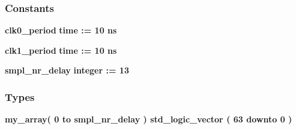 \subsubsection*{Constants}
 \begin{DoxyCompactItemize}
\item 
{\bf clk0\+\_\+period} {\bfseries \textcolor{comment}{time}\textcolor{vhdlchar}{ }\textcolor{vhdlchar}{ }\textcolor{vhdlchar}{\+:}\textcolor{vhdlchar}{=}\textcolor{vhdlchar}{ }\textcolor{vhdlchar}{ }\textcolor{vhdlchar}{ } \textcolor{vhdldigit}{10} \textcolor{vhdlchar}{ }\textcolor{vhdlchar}{ns}\textcolor{vhdlchar}{ }} 
\item 
{\bf clk1\+\_\+period} {\bfseries \textcolor{comment}{time}\textcolor{vhdlchar}{ }\textcolor{vhdlchar}{ }\textcolor{vhdlchar}{\+:}\textcolor{vhdlchar}{=}\textcolor{vhdlchar}{ }\textcolor{vhdlchar}{ }\textcolor{vhdlchar}{ } \textcolor{vhdldigit}{10} \textcolor{vhdlchar}{ }\textcolor{vhdlchar}{ns}\textcolor{vhdlchar}{ }} 
\item 
{\bf smpl\+\_\+nr\+\_\+delay} {\bfseries \textcolor{comment}{integer}\textcolor{vhdlchar}{ }\textcolor{vhdlchar}{ }\textcolor{vhdlchar}{\+:}\textcolor{vhdlchar}{=}\textcolor{vhdlchar}{ }\textcolor{vhdlchar}{ } \textcolor{vhdldigit}{13} \textcolor{vhdlchar}{ }} 
\end{DoxyCompactItemize}
\subsubsection*{Types}
 \begin{DoxyCompactItemize}
\item 
{\bfseries {\bf my\+\_\+array}{\bfseries \textcolor{vhdlchar}{(}\textcolor{vhdlchar}{ }\textcolor{vhdlchar}{ } \textcolor{vhdldigit}{0} \textcolor{vhdlchar}{ }\textcolor{keywordflow}{to}\textcolor{vhdlchar}{ }\textcolor{vhdlchar}{ }\textcolor{vhdlchar}{ }\textcolor{vhdlchar}{ }{\bfseries {\bf smpl\+\_\+nr\+\_\+delay}} \textcolor{vhdlchar}{ }\textcolor{vhdlchar}{)}\textcolor{vhdlchar}{ }\textcolor{vhdlchar}{ }\textcolor{comment}{std\+\_\+logic\+\_\+vector}\textcolor{vhdlchar}{ }\textcolor{vhdlchar}{(}\textcolor{vhdlchar}{ }\textcolor{vhdlchar}{ } \textcolor{vhdldigit}{63} \textcolor{vhdlchar}{ }\textcolor{keywordflow}{downto}\textcolor{vhdlchar}{ }\textcolor{vhdlchar}{ } \textcolor{vhdldigit}{0} \textcolor{vhdlchar}{ }\textcolor{vhdlchar}{)}\textcolor{vhdlchar}{ }}} 
\end{DoxyCompactItemize}

